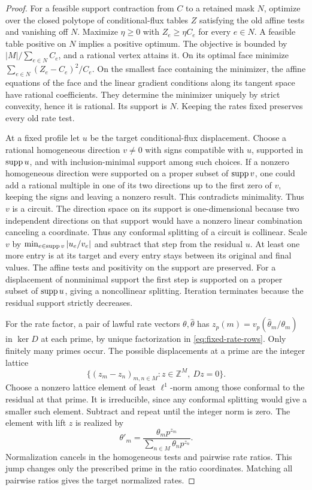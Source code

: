 \begin{proof}
For a feasible support contraction from \(C\) to a retained mask
\(N\), optimize over the closed polytope of conditional-flux tables
\(Z\) satisfying the old affine tests and vanishing off \(N\).
Maximize \(\eta\geq0\) with \(Z_e\geq\eta C_e\) for every \(e\in N\).
A feasible table positive on \(N\) implies a positive optimum.
The objective is bounded by \(|M|/\sum_{e\in N}C_e\), and a rational
vertex attains it. On its optimal face minimize
\(\sum_{e\in N}(Z_e-C_e)^2/C_e\). On the smallest face containing
the minimizer, the affine equations of the face and the linear
gradient conditions along its tangent space have rational
coefficients. They determine the minimizer uniquely by strict
convexity, hence it is rational. Its support is \(N\). Keeping the
rates fixed preserves every old rate test.

At a fixed profile let \(u\) be the target conditional-flux
displacement. Choose a rational homogeneous direction \(v\ne0\)
with signs compatible with \(u\), supported in \(\operatorname{supp} u\), and
with inclusion-minimal support among such choices. If a nonzero
homogeneous direction were supported on a proper subset of
\(\operatorname{supp} v\), one could add a rational multiple in one of its two
directions up to the first zero of \(v\), keeping the signs and
leaving a nonzero result. This contradicts minimality. Thus \(v\)
is a circuit. The direction space on its support is one-dimensional
because two independent directions on that support would have a
nonzero linear combination canceling a coordinate. Thus any
conformal splitting of a circuit is collinear. Scale \(v\) by
\(\min_{e\in\operatorname{supp} v}|u_e/v_e|\) and subtract that step from the
residual \(u\). At least one more entry is at its target and every
entry stays between its original and final values. The affine
tests and positivity on the support are preserved. For a
displacement of nonminimal support the first step is supported on
a proper subset of \(\operatorname{supp} u\), giving a noncollinear splitting.
Iteration terminates because the residual support strictly decreases.

For the rate factor, a pair of lawful rate vectors
\(\theta,\widehat\theta\) has
\(z_p(m)=v_p(\widehat\theta_m/\theta_m)\) in \(\ker D\) at each prime,
by unique factorization in \eqref{eq:fixed-rate-rows}. Only finitely
many primes occur. The possible displacements at a prime are the
integer lattice
\[
 \{(z_m-z_n)_{m,n\in M}:z\in\mathbb Z^M,\ Dz=0\}.
\]
Choose a nonzero lattice element of least \(\ell^1\)-norm among
those conformal to the residual at that prime. It is irreducible,
since any conformal splitting would give a smaller such element.
Subtract and repeat until the integer norm is zero. The element
with lift \(z\) is realized by
\begin{equation}\label{eq:fixed-prime-move}
 \theta'_m=\frac{\theta_m p^{z_m}}{\sum_{n\in M}\theta_n p^{z_n}}.
\end{equation}
Normalization cancels in the homogeneous tests and pairwise rate
ratios. This jump changes only the prescribed prime
in the ratio coordinates. Matching all pairwise ratios gives the
target normalized rates.


\end{proof}
